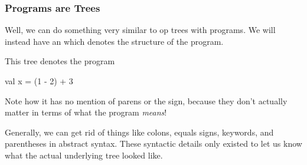 \documentclass[aspectratio=169]{beamer}
\begin{document}
\begin{frame}[fragile]
  \frametitle{Programs are Trees}

  Well, we can do something very similar to op trees with programs. We will
  instead have an  which denotes the structure
  of the program.

  \vspace{\fill}

  \begin{center}
    \begin{minipage}{0.6\textwidth}
      \raggedright
      This tree denotes the program
      \begin{codeblock}
        val x = (1 - 2) + 3
      \end{codeblock}

      Note how it has no mention of parens or the \code{=} sign, because they don't
      actually matter in terms of what the program \textit{means}!

      Generally, we can get rid of things like colons, equals signs, keywords,
      and parentheses in abstract syntax. These syntactic details only existed
      to let us know what the actual underlying tree looked like.
    \end{minipage}
    \begin{minipage}{0.38\textwidth}
      \centering
    \end{minipage}
  \end{center}
\end{frame}
\end{document}
